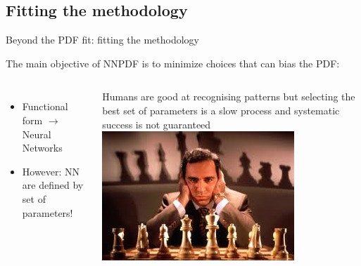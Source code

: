 \newcommand{\gct}{\color{darkgreen}\checkmark}
\newcommand{\rma}{\color{red}\ding{55}}
\newcommand{\bct}{\color{blue}\checkmark}

\author[Juan Cruz-Martinez]{}

\subsection{Fitting the methodology}

\begin{frame}{Beyond the PDF fit: fitting the methodology}

    The main objective of NNPDF is to minimize choices that can bias the PDF:

    \begin{columns}
        \begin{itemize}
            \item[\rma] Functional form $\longrightarrow$ Neural Networks
            \item[\rma] However: NN are defined by set of parameters!
        \end{itemize}

        \vspace{0.2cm}

        Humans are good at recognising patterns but selecting the best
        set of parameters is a slow process and systematic success is not guaranteed
        \includegraphics[width=\textwidth]{juan_future_hyperopt/kasparov.jpg}


\end{columns}
\end{frame}
